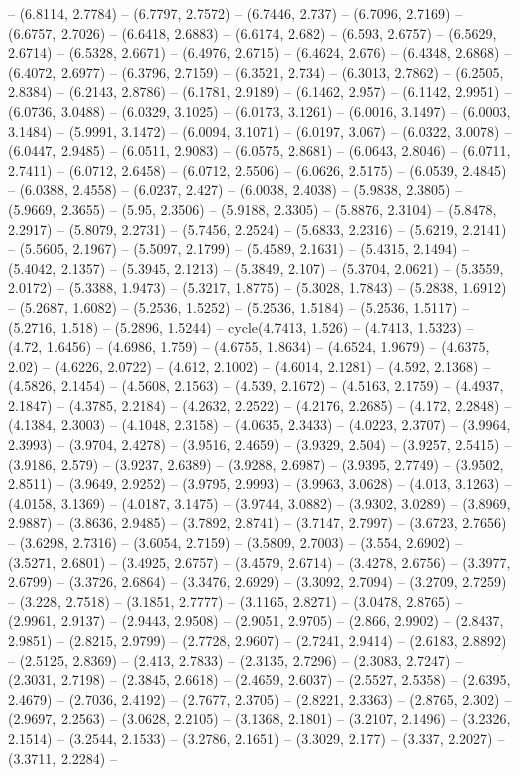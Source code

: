 -- (6.8114, 2.7784) -- (6.7797, 2.7572) -- (6.7446, 2.737) -- (6.7096, 2.7169) -- (6.6757, 2.7026) -- (6.6418, 2.6883) -- (6.6174, 2.682) -- (6.593, 2.6757) -- (6.5629, 2.6714) -- (6.5328, 2.6671) -- (6.4976, 2.6715) -- (6.4624, 2.676) -- (6.4348, 2.6868) -- (6.4072, 2.6977) -- (6.3796, 2.7159) -- (6.3521, 2.734) -- (6.3013, 2.7862) -- (6.2505, 2.8384) -- (6.2143, 2.8786) -- (6.1781, 2.9189) -- (6.1462, 2.957) -- (6.1142, 2.9951) -- (6.0736, 3.0488) -- (6.0329, 3.1025) -- (6.0173, 3.1261) -- (6.0016, 3.1497) -- (6.0003, 3.1484) -- (5.9991, 3.1472) -- (6.0094, 3.1071) -- (6.0197, 3.067) -- (6.0322, 3.0078) -- (6.0447, 2.9485) -- (6.0511, 2.9083) -- (6.0575, 2.8681) -- (6.0643, 2.8046) -- (6.0711, 2.7411) -- (6.0712, 2.6458) -- (6.0712, 2.5506) -- (6.0626, 2.5175) -- (6.0539, 2.4845) -- (6.0388, 2.4558) -- (6.0237, 2.427) -- (6.0038, 2.4038) -- (5.9838, 2.3805) -- (5.9669, 2.3655) -- (5.95, 2.3506) -- (5.9188, 2.3305) -- (5.8876, 2.3104) -- (5.8478, 2.2917) -- (5.8079, 2.2731) -- (5.7456, 2.2524) -- (5.6833, 2.2316) -- (5.6219, 2.2141) -- (5.5605, 2.1967) -- (5.5097, 2.1799) -- (5.4589, 2.1631) -- (5.4315, 2.1494) -- (5.4042, 2.1357) -- (5.3945, 2.1213) -- (5.3849, 2.107) -- (5.3704, 2.0621) -- (5.3559, 2.0172) -- (5.3388, 1.9473) -- (5.3217, 1.8775) -- (5.3028, 1.7843) -- (5.2838, 1.6912) -- (5.2687, 1.6082) -- (5.2536, 1.5252) -- (5.2536, 1.5184) -- (5.2536, 1.5117) -- (5.2716, 1.518) -- (5.2896, 1.5244) -- cycle(4.7413, 1.526) -- (4.7413, 1.5323) -- (4.72, 1.6456) -- (4.6986, 1.759) -- (4.6755, 1.8634) -- (4.6524, 1.9679) -- (4.6375, 2.02) -- (4.6226, 2.0722) -- (4.612, 2.1002) -- (4.6014, 2.1281) -- (4.592, 2.1368) -- (4.5826, 2.1454) -- (4.5608, 2.1563) -- (4.539, 2.1672) -- (4.5163, 2.1759) -- (4.4937, 2.1847) -- (4.3785, 2.2184) -- (4.2632, 2.2522) -- (4.2176, 2.2685) -- (4.172, 2.2848) -- (4.1384, 2.3003) -- (4.1048, 2.3158) -- (4.0635, 2.3433) -- (4.0223, 2.3707) -- (3.9964, 2.3993) -- (3.9704, 2.4278) -- (3.9516, 2.4659) -- (3.9329, 2.504) -- (3.9257, 2.5415) -- (3.9186, 2.579) -- (3.9237, 2.6389) -- (3.9288, 2.6987) -- (3.9395, 2.7749) -- (3.9502, 2.8511) -- (3.9649, 2.9252) -- (3.9795, 2.9993) -- (3.9963, 3.0628) -- (4.013, 3.1263) -- (4.0158, 3.1369) -- (4.0187, 3.1475) -- (3.9744, 3.0882) -- (3.9302, 3.0289) -- (3.8969, 2.9887) -- (3.8636, 2.9485) -- (3.7892, 2.8741) -- (3.7147, 2.7997) -- (3.6723, 2.7656) -- (3.6298, 2.7316) -- (3.6054, 2.7159) -- (3.5809, 2.7003) -- (3.554, 2.6902) -- (3.5271, 2.6801) -- (3.4925, 2.6757) -- (3.4579, 2.6714) -- (3.4278, 2.6756) -- (3.3977, 2.6799) -- (3.3726, 2.6864) -- (3.3476, 2.6929) -- (3.3092, 2.7094) -- (3.2709, 2.7259) -- (3.228, 2.7518) -- (3.1851, 2.7777) -- (3.1165, 2.8271) -- (3.0478, 2.8765) -- (2.9961, 2.9137) -- (2.9443, 2.9508) -- (2.9051, 2.9705) -- (2.866, 2.9902) -- (2.8437, 2.9851) -- (2.8215, 2.9799) -- (2.7728, 2.9607) -- (2.7241, 2.9414) -- (2.6183, 2.8892) -- (2.5125, 2.8369) -- (2.413, 2.7833) -- (2.3135, 2.7296) -- (2.3083, 2.7247) -- (2.3031, 2.7198) -- (2.3845, 2.6618) -- (2.4659, 2.6037) -- (2.5527, 2.5358) -- (2.6395, 2.4679) -- (2.7036, 2.4192) -- (2.7677, 2.3705) -- (2.8221, 2.3363) -- (2.8765, 2.302) -- (2.9697, 2.2563) -- (3.0628, 2.2105) -- (3.1368, 2.1801) -- (3.2107, 2.1496) -- (3.2326, 2.1514) -- (3.2544, 2.1533) -- (3.2786, 2.1651) -- (3.3029, 2.177) -- (3.337, 2.2027) -- (3.3711, 2.2284) -- 